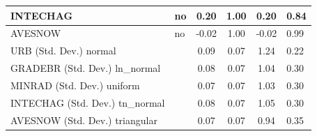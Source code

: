 \begin{table}
\begin{center}
\begin{tabular}{|l|l|c|c|c|l|}
			\hline
			INTECHAG & no & 0.20 & 1.00 & 0.20 & 0.84 \\
			\hline
			AVESNOW & no & -0.02 & 1.00 & -0.02 & 0.99 \\
			\hline
			URB (Std. Dev.) normal &  & 0.09 & 0.07 & 1.24 & 0.22 \\
			\hline
			GRADEBR (Std. Dev.) ln_normal &  & 0.08 & 0.07 & 1.04 & 0.30 \\
			\hline
			MINRAD (Std. Dev.) uniform &  & 0.07 & 0.07 & 1.03 & 0.30 \\
			\hline
			INTECHAG (Std. Dev.) tn_normal &  & 0.08 & 0.07 & 1.05 & 0.30 \\
			\hline
			AVESNOW (Std. Dev.) triangular &  & 0.07 & 0.07 & 0.94 & 0.35 \\
			\hline
		\end{tabular}
	\end{center}
\end{table}